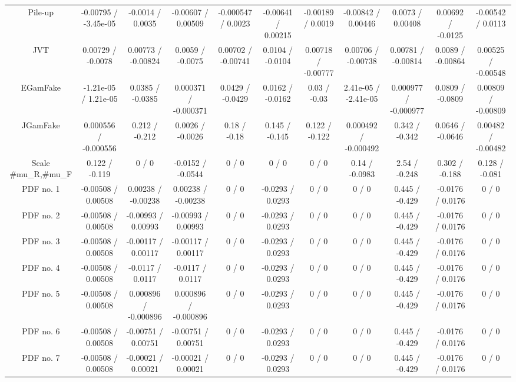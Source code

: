 \begin{table}[htbp]
\begin{center}
\begin{tabular}{|c|c|c|c|c|c|c|c|c|c|c|}
  Pile-up & -0.00795 / -3.45e-05 & -0.0014 / 0.0035 & -0.00607 / 0.00509 & -0.000547 / 0.0023 & -0.00641 / 0.00215 & -0.00189 / 0.0019 & -0.00842 / 0.00446 & 0.0073 / 0.00408 & 0.00692 / -0.0125 & -0.00542 / 0.0113 \\ 
  JVT & 0.00729 / -0.0078 & 0.00773 / -0.00824 & 0.0059 / -0.0075 & 0.00702 / -0.00741 & 0.0104 / -0.0104 & 0.00718 / -0.00777 & 0.00706 / -0.00738 & 0.00781 / -0.00814 & 0.0089 / -0.00864 & 0.00525 / -0.00548 \\ 
  EGamFake & -1.21e-05 / 1.21e-05 & 0.0385 / -0.0385 & 0.000371 / -0.000371 & 0.0429 / -0.0429 & 0.0162 / -0.0162 & 0.03 / -0.03 & 2.41e-05 / -2.41e-05 & 0.000977 / -0.000977 & 0.0809 / -0.0809 & 0.00809 / -0.00809 \\ 
  JGamFake & 0.000556 / -0.000556 & 0.212 / -0.212 & 0.0026 / -0.0026 & 0.18 / -0.18 & 0.145 / -0.145 & 0.122 / -0.122 & 0.000492 / -0.000492 & 0.342 / -0.342 & 0.0646 / -0.0646 & 0.00482 / -0.00482 \\ 
  Scale #mu_{R},#mu_{F} & 0.122 / -0.119 & 0 / 0 & -0.0152 / -0.0544 & 0 / 0 & 0 / 0 & 0 / 0 & 0.14 / -0.0983 & 2.54 / -0.248 & 0.302 / -0.188 & 0.128 / -0.081 \\ 
  PDF no. 1 & -0.00508 / 0.00508 & 0.00238 / -0.00238 & 0.00238 / -0.00238 & 0 / 0 & -0.0293 / 0.0293 & 0 / 0 & 0 / 0 & 0.445 / -0.429 & -0.0176 / 0.0176 & 0 / 0 \\ 
  PDF no. 2 & -0.00508 / 0.00508 & -0.00993 / 0.00993 & -0.00993 / 0.00993 & 0 / 0 & -0.0293 / 0.0293 & 0 / 0 & 0 / 0 & 0.445 / -0.429 & -0.0176 / 0.0176 & 0 / 0 \\ 
  PDF no. 3 & -0.00508 / 0.00508 & -0.00117 / 0.00117 & -0.00117 / 0.00117 & 0 / 0 & -0.0293 / 0.0293 & 0 / 0 & 0 / 0 & 0.445 / -0.429 & -0.0176 / 0.0176 & 0 / 0 \\ 
  PDF no. 4 & -0.00508 / 0.00508 & -0.0117 / 0.0117 & -0.0117 / 0.0117 & 0 / 0 & -0.0293 / 0.0293 & 0 / 0 & 0 / 0 & 0.445 / -0.429 & -0.0176 / 0.0176 & 0 / 0 \\ 
  PDF no. 5 & -0.00508 / 0.00508 & 0.000896 / -0.000896 & 0.000896 / -0.000896 & 0 / 0 & -0.0293 / 0.0293 & 0 / 0 & 0 / 0 & 0.445 / -0.429 & -0.0176 / 0.0176 & 0 / 0 \\ 
  PDF no. 6 & -0.00508 / 0.00508 & -0.00751 / 0.00751 & -0.00751 / 0.00751 & 0 / 0 & -0.0293 / 0.0293 & 0 / 0 & 0 / 0 & 0.445 / -0.429 & -0.0176 / 0.0176 & 0 / 0 \\ 
  PDF no. 7 & -0.00508 / 0.00508 & -0.00021 / 0.00021 & -0.00021 / 0.00021 & 0 / 0 & -0.0293 / 0.0293 & 0 / 0 & 0 / 0 & 0.445 / -0.429 & -0.0176 / 0.0176 & 0 / 0 \\ 

\end{tabular}
\end{center}
\end{table}

